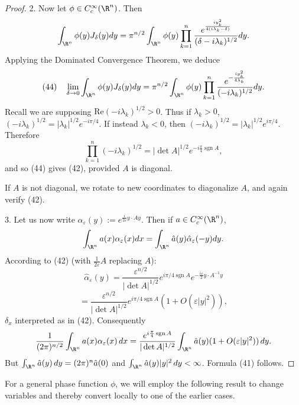 \begin{proof}
2. Now let $\phi \in C_c^\infty(\R^n)$. Then
$$\int_{\R^n} \phi(y) J_\delta(y) dy = \pi^{n/2} \int_{\R^n} \phi(y) \prod_{k=1}^{n} \frac{e^{\frac{iy_k^2}{4(i\lambda_k - \delta)}}}{(\delta - i\lambda_k)^{1/2}} dy.$$
Applying the Dominated Convergence Theorem, we deduce
$$(44) \quad \lim_{\delta \to 0} \int_{\R^n} \phi(y) J_\delta(y) dy = \pi^{n/2} \int_{\R^n} \phi(y) \prod_{k=1}^{n} \frac{e^{-\frac{iy_k^2}{4\lambda_k}}}{(-i\lambda_k)^{1/2}} dy.$$
Recall we are supposing $\text{Re}(-i\lambda_k)^{1/2} > 0$. Thus if $\lambda_k > 0$, $(-i\lambda_k)^{1/2} = |\lambda_k|^{1/2} e^{-i\pi/4}$. If instead $\lambda_k < 0$, then $(-i\lambda_k)^{1/2} = |\lambda_k|^{1/2} e^{i\pi/4}$. Therefore
$$\prod_{k=1}^n (-i\lambda_k)^{1/2} = |\det A|^{1/2} e^{-i\frac{\pi}{4} \operatorname{sgn} A},$$
and so (44) gives (42), provided $A$ is diagonal.

If $A$ is not diagonal, we rotate to new coordinates to diagonalize $A$, and again verify (42).

3. Let us now write $\alpha_\varepsilon(y) := e^{\frac{i}{2\varepsilon} y \cdot Ay}$. Then if $a \in C_c^\infty(\R^n)$,
$$\int_{\R^n} a(x) \alpha_\varepsilon(x) dx = \int_{\R^n} \hat{a}(y) \hat{\alpha}_\varepsilon(-y) dy.$$
According to (42) (with $\frac{1}{2\varepsilon} A$ replacing $A$):
$$\hat{\alpha}_\varepsilon(y) = \frac{\varepsilon^{n/2}}{|\det A|^{1/2}} e^{i\pi/4 \operatorname{sgn} A} e^{-\frac{i\varepsilon}{2} y \cdot A^{-1} y}$$
$$= \frac{\varepsilon^{n/2}}{|\det A|^{1/2}} e^{i\pi/4 \operatorname{sgn} A} (1 + O(\varepsilon|y|^2)),$$
$\delta_x$ interpreted as in (42). Consequently
$$\frac{1}{(2\pi)^{n/2}} \int_{\R^n} a(x)\alpha_\varepsilon(x) \, dx = \frac{e^{i\frac{\pi}{4} \operatorname{sgn} A}}{|\det A|^{1/2}} \int_{\R^n} \hat{a}(y)(1 + O(\varepsilon|y|^2)) \, dy.$$
But $\int_{\R^n} \hat{a}(y) \, dy = (2\pi)^n \hat{a}(0)$ and $\int_{\R^n} \hat{a}(y)|y|^2 \, dy < \infty$. Formula (41) follows.
\end{proof}

For a general phase function $\phi$, we will employ the following result to change variables and thereby convert locally to one of the earlier cases.

